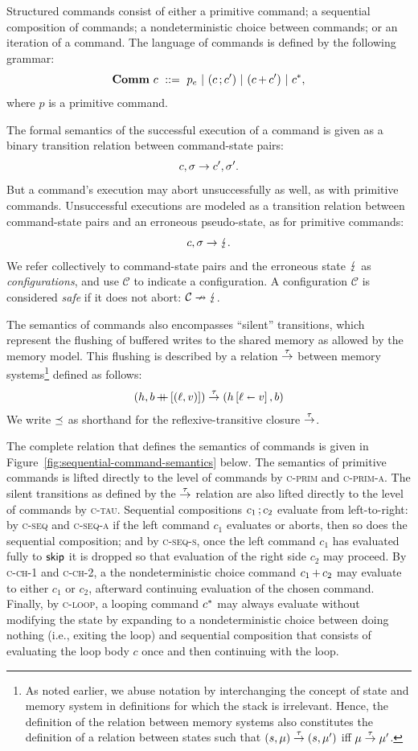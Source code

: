 \documentclass[11pt]{report}
\begin{document}
Structured commands consist of either a primitive command; a sequential composition of commands; a nondeterministic choice between commands; or an iteration of a command. The language of commands is defined by the following grammar: \[ \mathbf{Comm}~c ~::=~ p_e ~|~ (c \operatorname{;} c') ~|~ (c \operatorname{+} c') ~|~ c^{\operatorname{\ast}},\] where $p$ is a primitive command.  

The formal semantics of the successful execution of a command is given as a binary transition relation between command-state pairs: \[ c,\sigma \rightarrow c',\sigma'.\] But a command's execution may abort unsuccessfully as well, as with primitive commands. Unsuccessful executions are modeled as a transition relation between command-state pairs and an erroneous pseudo-state, as for primitive commands: \[ c,\sigma \rightarrow \lightning. \] We refer collectively to command-state pairs and the erroneous state $\lightning$ as \emph{configurations}, and use $\mathcal{C}$ to indicate a configuration. A configuration $\mathcal{C}$ is considered \emph{safe} if it does not abort: $\mathcal{C} \nrightarrow \lightning$.

The semantics of commands also encompasses ``silent'' transitions, which represent the flushing of buffered writes to the shared memory as allowed by the memory model. This flushing is described by a relation $\stackrel{\tau}{\rightarrow}$ between memory systems\footnote{As noted earlier, we abuse notation by interchanging the concept of state and memory system in definitions for which the stack is irrelevant. Hence, the definition of the relation between memory systems  also constitutes the definition of a relation between states such that $(s,\mu) \stackrel{\tau}{\rightarrow} (s,\mu')$ iff $\mu \stackrel{\tau}{\rightarrow} \mu'$.} defined as follows: \begin{align*} (h,b \operatorname{+\!\!\!+} \left[(\ell,v)\right]) \stackrel{\tau}{\rightarrow} (h \left[ \ell \shortleftarrow v \right],b) 
\end{align*} We write $\preceq$ as shorthand for the reflexive-transitive closure $\stackrel{\tau}{\rightarrow}$. 

The complete relation that defines the semantics of commands is given in Figure~\ref{fig:sequential-command-semantics} below. The semantics of primitive commands is lifted directly to the level of commands by \textsc{c-prim} and \textsc{c-prim-a}. The silent transitions as defined by the $\stackrel{\tau}{\rightarrow}$ relation are also lifted directly to the level of commands by \textsc{c-tau}. Sequential compositions $c_1 \operatorname{;} c_2$ evaluate from left-to-right: by \textsc{c-seq} and \textsc{c-seq-a} if the left command $c_1$ evaluates or aborts, then so does the sequential composition; and by \textsc{c-seq-s}, once the left command $c_1$ has evaluated fully to $\operatorname{\mathsf{skip}}$ it is dropped so that evaluation of the right side $c_2$ may proceed. By \textsc{c-ch-1} and \textsc{c-ch-2}, a the nondeterministic choice command $c_1 \operatorname{+} c_2$ may evaluate to either $c_1$ or $c_2$, afterward continuing evaluation of the chosen command. Finally, by \textsc{c-loop}, a looping command $c^{\operatorname{\ast}}$ may always evaluate without modifying the state by expanding to a nondeterministic choice between doing nothing (i.e., exiting the loop) and sequential composition that consists of evaluating the loop body $c$ once and then continuing with the loop. 
\end{document}
